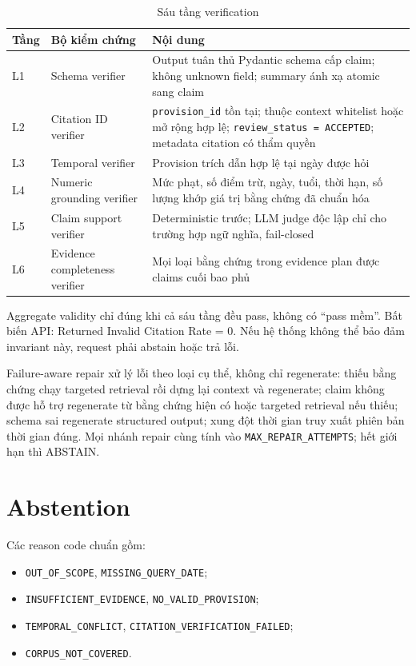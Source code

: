 \documentclass[a4paper,12pt]{extreport}
\newcommand{\code}[1]{\texttt{#1}}
\begin{document}
\begin{table}[H]
\caption{Sáu tầng verification}
\begin{tabularx}{\textwidth}{p{1.2cm}p{4.2cm}Y}
\toprule
\textbf{Tầng} & \textbf{Bộ kiểm chứng} & \textbf{Nội dung}\\
\midrule
L1 & Schema verifier & Output tuân thủ Pydantic schema cấp claim; không unknown field; summary ánh xạ atomic sang claim\\
L2 & Citation ID verifier & \code{provision\_id} tồn tại; thuộc context whitelist hoặc mở rộng hợp lệ; \code{review\_status = ACCEPTED}; metadata citation có thẩm quyền\\
L3 & Temporal verifier & Provision trích dẫn hợp lệ tại ngày được hỏi\\
L4 & Numeric grounding verifier & Mức phạt, số điểm trừ, ngày, tuổi, thời hạn, số lượng khớp giá trị bằng chứng đã chuẩn hóa\\
L5 & Claim support verifier & Deterministic trước; LLM judge độc lập chỉ cho trường hợp ngữ nghĩa, fail-closed\\
L6 & Evidence completeness verifier & Mọi loại bằng chứng trong evidence plan được claims cuối bao phủ\\
\bottomrule
\end{tabularx}
\end{table}

Aggregate validity chỉ đúng khi cả sáu tầng đều pass, không có ``pass mềm''. Bất biến API: Returned Invalid Citation Rate = 0. Nếu hệ thống không thể bảo đảm invariant này, request phải abstain hoặc trả lỗi.

Failure-aware repair xử lý lỗi theo loại cụ thể, không chỉ regenerate: thiếu bằng chứng chạy targeted retrieval rồi dựng lại context và regenerate; claim không được hỗ trợ regenerate từ bằng chứng hiện có hoặc targeted retrieval nếu thiếu; schema sai regenerate structured output; xung đột thời gian truy xuất phiên bản thời gian đúng. Mọi nhánh repair cùng tính vào \code{MAX\_REPAIR\_ATTEMPTS}; hết giới hạn thì ABSTAIN.

\section{Abstention}

Các reason code chuẩn gồm:
\begin{itemize}
  \item \code{OUT\_OF\_SCOPE}, \code{MISSING\_QUERY\_DATE};
  \item \code{INSUFFICIENT\_EVIDENCE}, \code{NO\_VALID\_PROVISION};
  \item \code{TEMPORAL\_CONFLICT}, \code{CITATION\_VERIFICATION\_FAILED};
  \item \code{CORPUS\_NOT\_COVERED}.
\end{itemize}
\end{document}
